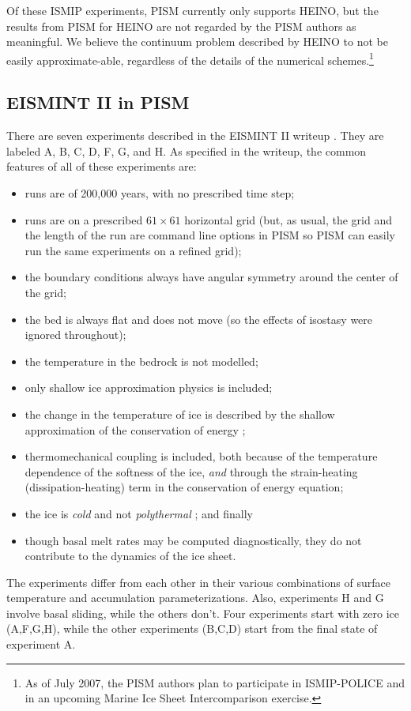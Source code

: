 \documentclass[11pt,final]{amsart}
\begin{document}
Of these ISMIP experiments, PISM currently only supports HEINO, but the results from PISM for HEINO are not regarded by the PISM authors as meaningful.  We believe the continuum problem described by HEINO to not be easily approximate-able, regardless of the details of the numerical schemes.\footnote{As of July 2007, the PISM authors plan to participate in ISMIP-POLICE and in an upcoming Marine Ice Sheet Intercomparison exercise.}

\subsection{EISMINT II in PISM}  There are seven experiments described in the EISMINT II writeup \cite{EISMINT00}. They are labeled A, B, C, D, F, G, and H.  As specified in the writeup, the common features of all of these experiments are:\begin{itemize}
\item runs are of 200,000 years, with no prescribed time step;
\item runs are on a prescribed $61\times 61$ horizontal grid (but, as usual, the grid and the length of the run are command line options in PISM so PISM can easily run the same experiments on a refined grid);
\item the boundary conditions always have angular symmetry around the center of the grid;
\item the bed is always flat and does not move (so the effects of isostasy were ignored throughout);
\item the temperature in the bedrock is not modelled;
\item only shallow ice approximation physics is included;
\item the change in the temperature of ice is described by the shallow approximation of the conservation of energy \cite{Fowler};
\item thermomechanical coupling is included, both because of the temperature dependence of the softness of the ice, \emph{and} through the strain-heating (dissipation-heating) term in the conservation of energy equation;
\item the ice is \emph{cold} and not \emph{polythermal} \cite{Greve}; and finally
\item though basal melt rates may be computed diagnostically, they do not contribute to the dynamics of the ice sheet.
\end{itemize}
The experiments differ from each other in their various combinations of surface temperature and accumulation parameterizations.  Also, experiments H and G involve basal sliding, while the others don't.  Four experiments start with zero ice (A,F,G,H), while the other experiments (B,C,D) start from the final state of experiment A.
\end{document}
